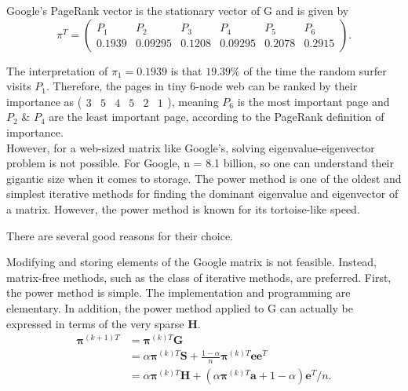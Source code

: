 \noindent Google's PageRank vector is the stationary vector of $\mathrm{G}$ and is given by
$$
\pi^{T}=\left(\begin{array}{cccccc}
	P_1 & P_2 & P_3 & P_4 & P_5 & P_6 \\
	0.1939 & 0.09295 & 0.1208 & 0.09295 & 0.2078 & 0.2915
\end{array}\right) .
$$

\noindent The interpretation of $\pi_{1}=0.1939$ is that $19.39 \%$ of the time the random surfer visits $P_1$. Therefore, the pages in tiny 6-node web can be ranked by their importance as ($\begin{matrix}
3 & 5 & 4 & 5 & 2 & 1
\end{matrix}$), meaning $P_6$ is the most important page and $P_2$ \& $P_4$ are the least important page, according to the PageRank definition of importance.\\


\noindent However, for a web-sized matrix like Google's, solving eigenvalue-eigenvector problem is not possible.  For Google,
n = 8.1 billion, so one can understand their gigantic size when it comes to storage.
The power method is one of the oldest and simplest iterative methods for finding the dominant eigenvalue and eigenvector of a matrix. However, the power method is known for its tortoise-like speed.

\noindent There are several good reasons for their choice.

\noindent Modifying and storing elements of the Google matrix is not feasible. %
Instead, matrix-free methods, such as the class of iterative methods, are preferred. First, the power method is simple. The implementation and programming are elementary. In addition, the power method applied to $\mathrm{G}$  can actually be expressed in terms of the very sparse $\mathbf{H}$.
$$
\begin{aligned}
	\boldsymbol{\pi}^{(k+1) T} &=\boldsymbol{\pi}^{(k) T} \mathbf{G} \\
	&=\alpha \boldsymbol{\pi}^{(k) T} \mathbf{S}+\frac{1-\alpha}{n} \boldsymbol{\pi}^{(k) T} \mathbf{e} \mathbf{e}^{T} \\
	&=\alpha \boldsymbol{\pi}^{(k) T} \mathbf{H}+\left(\alpha \boldsymbol{\pi}^{(k) T} \mathbf{a}+1-\alpha\right) \mathbf{e}^{T} / n .
	\end{aligned}
$$
	
